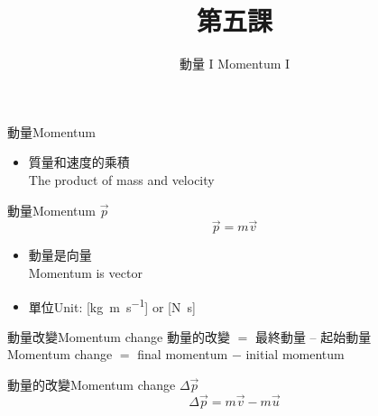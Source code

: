 \documentclass[13pt]{beamer}
\title{第五課}
\author{動量 I Momentum I}
\institute{周末班}
\date{}
\begin{document}
\frame{\titlepage}



\begin{frame}{動量Momentum}
    \begin{itemize}
        \item 質量和速度的乘積\\The product of mass and velocity
    \end{itemize}
    \begin{alertblock}
        {動量Momentum $\vec{p}$}
        \begin{equation}
            \vec{p}=m\vec{v}
        \end{equation}
    \end{alertblock}
    \begin{itemize}
        \item 動量是向量\\Momentum is vector
        \item 單位Unit: [\unit{kg.m.s^{-1}}] or [\unit{N.s}]
    \end{itemize}
\end{frame}

\begin{frame}{動量改變Momentum change}
    動量的改變 $=$ 最終動量 $–$ 起始動量\\Momentum change $=$ final momentum $-$ initial momentum
    \begin{exampleblock}
        {動量的改變Momentum change $\Delta \vec{p}$}
        \begin{equation}
            \Delta\vec{p}=m\vec{v}-m\vec{u}
        \end{equation}
    \end{exampleblock}
\end{frame}
\end{document}
